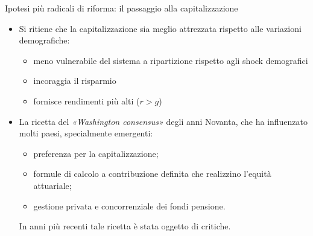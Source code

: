 \documentclass[aspectratio=64,12pt]{beamer}
\begin{document}
\begin{frame}{Ipotesi più radicali di riforma: il passaggio alla capitalizzazione}
\begin{itemize}
\item Si ritiene che la capitalizzazione sia meglio attrezzata rispetto alle
variazioni demografiche:
\begin{itemize}
\item meno vulnerabile del sistema a ripartizione rispetto agli shock
demografici
\item incoraggia il risparmio
\item fornisce rendimenti più alti ($r>g$)
\end{itemize}
\item La ricetta del \emph{«Washington consensus»} degli anni Novanta, che ha
influenzato molti paesi, specialmente emergenti:
\begin{itemize}
\item preferenza per la capitalizzazione;
\item formule di calcolo a contribuzione definita che realizzino l'equità
attuariale;
\item gestione privata e concorrenziale dei fondi pensione.
\end{itemize}
In anni più recenti tale ricetta è stata oggetto di critiche.
\end{itemize}
\end{frame}
\end{document}
